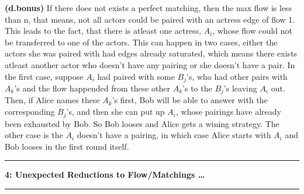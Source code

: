 \documentclass{article}
\newcommand\question[2]{\vspace{.25in}\hrule\textbf{#1: #2}\hrule\vspace{.10in}}
\renewcommand\part[1]{\vspace{.10in}\textbf{(#1)}}
\begin{document}
  \part{d.bonus} If there does not exists a perfect matching, then the max flow is less than n, that means, not all actors could be paired with an actress edge of flow 1. This leads to the fact, that there is atleast one actress, $A_i$, whose flow could not be transferred to one of the actors. This can happen in two cases, either the actors she was paired with had edges already saturated, which means there exists atleast another actor who doesn't have any pairing or she doesn't have a pair. In the first case, suppose $A_{i}$ had paired with some $B_j$'s, who had other pairs with $A_k$'s and the flow happended from these other $A_k$'s to the $B_j$'s leaving $A_i$ out. Then, if Alice names these $A_k$'s first, Bob will be able to answer with the corresponding $B_j$'s, and then she can put up $A_i$, whose pairings have already been exhausted by Bob. So Bob looses and Alice gets a wining strategy. The other case is the $A_i$ doesn't have a pairing, in which case Alice starts with $A_i$ and Bob looses in the first round itself. \newline

  \question{4}{Unexpected Reductions to Flow/Matchings \dots}
   
 
\end{document}
